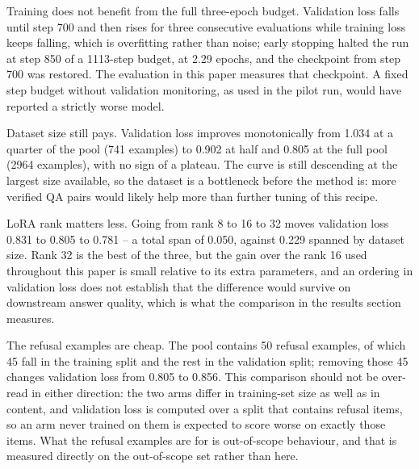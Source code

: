 \documentclass[11pt,a4paper]{article}
\begin{document}
Training does not benefit from the full three-epoch budget. Validation loss falls until step 700 and then rises for three consecutive evaluations while training loss keeps falling, which is overfitting rather than noise; early stopping halted the run at step 850 of a 1113-step budget, at 2.29 epochs, and the checkpoint from step 700 was restored. The evaluation in this paper measures that checkpoint. A fixed step budget without validation monitoring, as used in the pilot run, would have reported a strictly worse model.

Dataset size still pays. Validation loss improves monotonically from 1.034 at a quarter of the pool (741 examples) to 0.902 at half and 0.805 at the full pool (2964 examples), with no sign of a plateau. The curve is still descending at the largest size available, so the dataset is a bottleneck before the method is: more verified QA pairs would likely help more than further tuning of this recipe.

LoRA rank matters less. Going from rank 8 to 16 to 32 moves validation loss 0.831 to 0.805 to 0.781 -- a total span of 0.050, against 0.229 spanned by dataset size. Rank 32 is the best of the three, but the gain over the rank 16 used throughout this paper is small relative to its extra parameters, and an ordering in validation loss does not establish that the difference would survive on downstream answer quality, which is what the comparison in the results section measures.

The refusal examples are cheap. The pool contains 50 refusal examples, of which 45 fall in the training split and the rest in the validation split; removing those 45 changes validation loss from 0.805 to 0.856. This comparison should not be over-read in either direction: the two arms differ in training-set size as well as in content, and validation loss is computed over a split that contains refusal items, so an arm never trained on them is expected to score worse on exactly those items. What the refusal examples are for is out-of-scope behaviour, and that is measured directly on the out-of-scope set rather than here.
\end{document}
